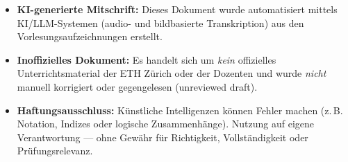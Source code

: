 \documentclass[11pt,a4paper]{report}
\theoremstyle{purplethm}
\begin{document}
\begin{titlepage}
\begin{minipage}{\textwidth}
\begin{tcolorbox}[
        arc=6pt,
        boxrule=0.7pt,
        colback=MidnightBlue!3!white,
        colframe=MidnightBlue!30!white,
        left=10pt, right=10pt, top=8pt, bottom=8pt
    ]
    \vspace{0.25cm}
    \sffamily\small\color{black!75}
    \begin{itemize}[leftmargin=1.5em, itemsep=3pt, topsep=0pt, parsep=0pt]
        \item[\textcolor{MidnightBlue!80!black}{\small\faRobot}] \textbf{KI-generierte Mitschrift:} Dieses Dokument wurde automatisiert mittels KI/LLM-Systemen (audio- und bildbasierte Transkription) aus den Vorlesungsaufzeichnungen erstellt.
        \item[\textcolor{MidnightBlue!80!black}{\small\faUserShield}] \textbf{Inoffizielles Dokument:} Es handelt sich um \emph{kein} offizielles Unterrichtsmaterial der ETH Zürich oder der Dozenten und wurde \emph{nicht} manuell korrigiert oder gegengelesen (unreviewed draft).
        \item[\textcolor{MidnightBlue!80!black}{\small\faExclamationTriangle}] \textbf{Haftungsausschluss:} Künstliche Intelligenzen können Fehler machen (z.\,B. Notation, Indizes oder logische Zusammenhänge). Nutzung auf eigene Verantwortung --- ohne Gewähr für Richtigkeit, Vollständigkeit oder Prüfungsrelevanz.
    \end{itemize}
    \end{tcolorbox}
\end{minipage}
\vspace*{0.5cm}
\end{titlepage}

\cleardoublepage
{}
\tableofcontents
\cleardoublepage























% 
\end{document}

